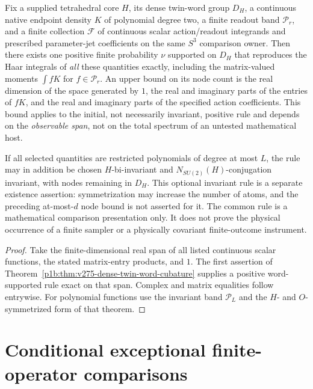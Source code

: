 \documentclass[12pt,a4paper]{article}
\begin{document}
\begin{corollary}
\label{p2e:cor:v275-joint-observable-exactification}
Fix a supplied tetrahedral core $H$, its dense twin-word group
$D_H$, a continuous native endpoint density $K$ of polynomial
degree two, a finite readout band $\mathcal P_r$, and a finite
collection $\mathscr F$ of continuous scalar action/readout
integrands and prescribed parameter-jet coefficients on the same
$S^3$ comparison owner. Then there exists one positive finite
probability $\nu$ supported on $D_H$ that reproduces the Haar
integrals of \emph{all} these quantities exactly, including the
matrix-valued moments $\int fK$ for $f\in\mathcal P_r$.
An upper bound on its node count is the real dimension of the
space generated by $1$, the real and imaginary parts of the
entries of $fK$, and the real and imaginary parts of the
specified action coefficients. This bound applies to the initial,
not necessarily invariant, positive rule and depends on the
\emph{observable span}, not on the total spectrum of an untested
mathematical host.

If all selected quantities are restricted polynomials of degree
at most $L$, the rule may in addition be chosen
$H$-bi-invariant and $N_{SU(2)}(H)$-conjugation invariant, with
nodes remaining in $D_H$. This optional invariant rule is a
separate existence assertion: symmetrization may increase the
number of atoms, and the preceding at-most-$d$ node bound is
not asserted for it. The common rule is a mathematical
comparison presentation only. It does not prove the physical
occurrence of a finite sampler or a physically covariant
finite-outcome instrument.
\end{corollary}
\begin{proof}
Take the finite-dimensional real span of all listed continuous
scalar functions, the stated matrix-entry products, and $1$.
The first assertion of
Theorem~\ref{p1b:thm:v275-dense-twin-word-cubature}
supplies a positive word-supported rule exact on that span.
Complex and matrix equalities follow entrywise. For polynomial
functions use the invariant band $\mathcal P_L$ and the
$H$- and $O$-symmetrized form of that theorem.
\end{proof}

\section{Conditional exceptional finite-operator comparisons}
\end{document}
